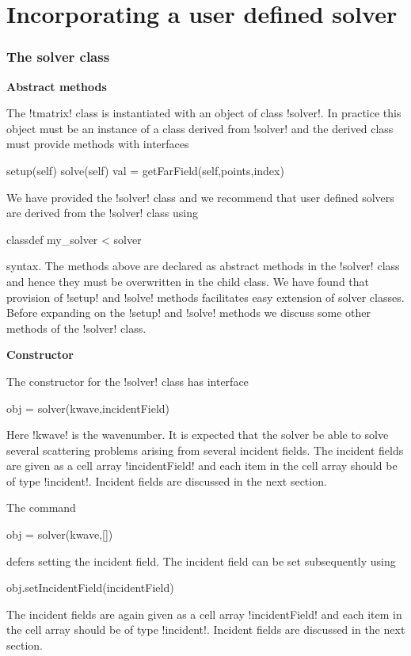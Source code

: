 \documentclass[12pt,letterpaper,final]{article}
\newcommand{\techheading}[1]{%
    \par\vspace{-0.3\parskip}\noindent\hspace{-1cm}\textbf{#1}%
    \par\vspace{-0.5\parskip}\noindent\nopagebreak\ignorespaces}
\begin{document}
\part{Incorporating a user defined solver}
\label{part:solvers-user}

\section{The solver class}

\techheading{Abstract methods}
The !tmatrix! class is instantiated with an object of class !solver!.
In practice this object must be an instance of a class derived from
!solver! and the derived class must provide methods with interfaces
\begin{matlab}
setup(self)
solve(self)
val = getFarField(self,points,index)
\end{matlab}
We have provided the !solver! class and we recommend that user defined
solvers are derived from the !solver! class using
\begin{matlab}
classdef my_solver < solver
\end{matlab}
syntax.
The methods above are declared as abstract methods in the !solver! class and 
hence they must be overwritten in the child class.
We have found that provision of !setup! and !solve! methods facilitates
easy extension of solver classes.
Before expanding on the !setup! and !solve! methods we discuss 
some other methods of the !solver! class.

\techheading{Constructor}
The constructor for the !solver! class has interface
\begin{matlab}
obj = solver(kwave,incidentField)
\end{matlab}
Here !kwave! is the wavenumber.
It is expected that the solver be able to solve several 
scattering problems arising from several incident fields.
The incident fields are given as a cell array 
!incidentField! and each item in the cell array should be of type !incident!.
Incident fields are discussed in the next section.

The command
\begin{matlab}
obj = solver(kwave,[])
\end{matlab}
defers setting the incident field.
The incident field can be set subsequently using
\begin{matlab}
obj.setIncidentField(incidentField)
\end{matlab}
The incident fields are again given as a cell array 
!incidentField! and each item in the cell array should be of type !incident!.
Incident fields are discussed in the next section.
\end{document}
